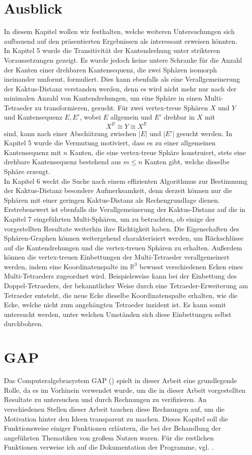 \documentclass[12pt,titlepage,twoside,cleardoublepage]{article}
\theoremstyle{nummermitklammern}
\numberwithin{equation}{section}
\begin{document}
\section{Ausblick}
In diesem Kapitel wollen wir festhalten, welche weiteren Untersuchungen sich aufbauend auf den präsentierten Ergebnissen als interessant erweisen könnten.\\
In Kapitel 5 wurde die Transitivität der Kantendrehung unter strikteren Voraussetzungen gezeigt. Es wurde jedoch keine untere Schranke für die Anzahl der Kanten einer drehbaren Kantensequenz, die zwei Sphären isomorph ineinander umformt, formuliert. Dies kann ebenfalls als eine Verallgemeinerung der Kaktus-Distanz verstanden werden, denn es wird nicht mehr nur nach der minimalen Anzahl von Kantendrehungen, um eine Sphäre in einen Multi-Tetraeder zu transformieren, gesucht. Für zwei vertex-treue Sphären $X$ und $Y$ und Kantensequenz $E,E'$, wobei $E$ allgemein und $E'$ drehbar in $X$ mit 
\[
X^E\cong Y \cong X^{E}
\] 
sind, kann nach einer Abschätzung zwischen $\vert E\vert $ und $\vert E' \vert$ gesucht werden. In Kapitel 5 wurde die Vermutung motiviert, dass es zu einer allgemeinen Kantensequenz mit $n$ Kanten, die eine vertex-treue Sphäre konstruiert, stets eine drehbare Kantensequenz bestehend aus $m\leq n$ Kanten gibt, welche dieselbe Sphäre erzeugt. \\
In Kapitel 6 weckt die Suche nach einem effizienten Algorithmus zur Bestimmung der Kaktus-Distanz besondere Aufmerksamkeit, denn derzeit können nur die Sphären mit einer geringen Kaktus-Distanz als Rechengrundlage dienen.  Erstrebenswert ist ebenfalls die Verallgemeinerung der Kaktus-Distanz auf die in Kapitel 7 eingeführten  Multi-Sphären, um zu  betrachten, ob einige der vorgestellten Resultate weiterhin ihre Richtigkeit haben. Die Eigenschaften des Sphären-Graphen können weitergehend charakterisiert werden, um Rückschlüsse auf die Kantendrehungen und die vertex-treuen Sphären zu erhalten.
Außerdem können die vertex-treuen Einbettungen der Multi-Tetraeder verallgemeinert werden, indem eine Koordinatenspalte im $\mathbb{R}^3$ bewusst verschiedenen Ecken eines Multi-Tetraeders zugeordnet wird. Beispielsweise kann bei der Einbettung des Doppel-Tetraeders, der bekanntlicher Weise durch eine Tetraeder-Erweiterung am Tetraeder entsteht, die neue Ecke dieselbe Koordinatenspalte erhalten, wie die Ecke, welche nicht zum angehängten Tetraeder inzident ist. Es kann somit untersucht werden, unter welchen Umständen sich diese Einbettungen selbst durchbohren. 
\newpage
\section{GAP}
Das Computeralgebrasystem GAP (\cite{gap}) spielt in dieser Arbeit eine grundlegende Rolle, da es im Vorhinein verwendet wurde, um die in dieser Arbeit vorgestellten Resultate zu untersuchen und durch Rechnungen zu verifizieren. 
An verschiedenen Stellen dieser Arbeit tauchen diese Rechnungen auf, um die Motivation hinter den Ideen transparent zu machen.
 Dieses Kapitel soll die Funktionsweise einiger Funktionen erläutern, die bei der Behandlung der angeführten Thematiken von großem Nutzen waren. Für die restlichen Funktionen verweise ich auf die Dokumentation der Programme, vgl. \cite{reygap}.
\end{document}
